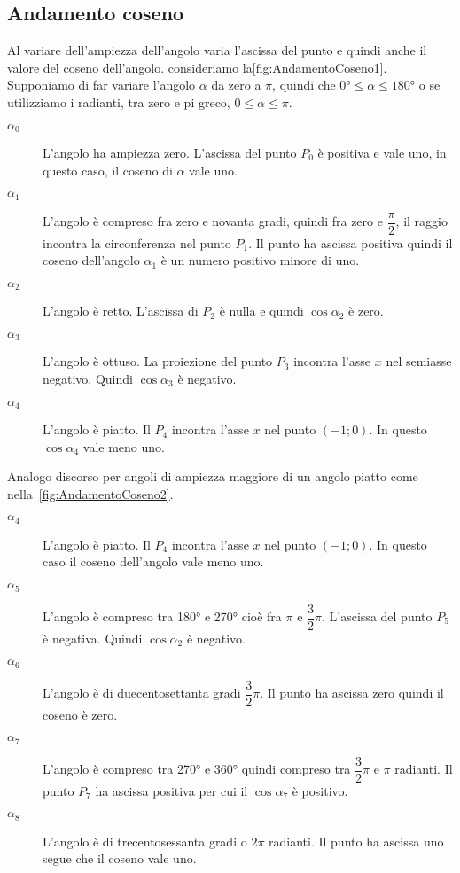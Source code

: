 \subsection{Andamento coseno}
\label{sec:andamentocoseno}
Al variare dell'ampiezza dell'angolo varia l'ascissa del punto e quindi anche il valore del coseno dell'angolo. consideriamo la\nobs\vref{fig:AndamentoCoseno1}. Supponiamo di far variare l'angolo $\alpha$ da zero a $\pi$, quindi che $\ang{0}\leq\alpha\leq\ang{180}$ o se utilizziamo i radianti, tra zero e pi greco, $\num{0}\leq\alpha\leq\pi$. 
\begin{description}
	\item[$\alpha_0$] L'angolo ha ampiezza zero. L'ascissa del punto $P_0$ è positiva e vale uno, in questo caso, il coseno di $\alpha$ vale uno.
	\item [$\alpha_1$] L'angolo è compreso fra zero e novanta gradi, quindi fra zero e $\dfrac{\pi}{2} $, il raggio incontra la circonferenza nel punto $P_1$. Il punto ha ascissa positiva quindi il coseno dell'angolo $\alpha_1$ è un numero positivo minore di uno.
	\item [$\alpha_2$] L'angolo è retto. L'ascissa di $P_{2}$ è nulla e quindi $\cos\alpha_2$ è zero. 
	\item [$\alpha_3$] L'angolo è ottuso. La proiezione del punto $P_3$ incontra l'asse $x$ nel semiasse negativo. Quindi $\cos\alpha_3$ è negativo.
	\item [$\alpha_4$] L'angolo è piatto. Il $P_4$ incontra l'asse $x$ nel punto $(-1;0)$. In questo $\cos\alpha_4$ vale meno uno.
\end{description}
\begin{figure}
	\centering
	
	\label{fig:circonferenzagonimetricagonio}
\end{figure}
Analogo discorso per angoli di ampiezza maggiore di un angolo piatto come nella~\vref{fig:AndamentoCoseno2}.
\begin{description}
	\item [$\alpha_4$] L'angolo è piatto. Il $P_4$ incontra l'asse $x$ nel punto $(-1;0)$. In questo caso il coseno dell'angolo vale meno uno.
	\item [$\alpha_5$] L'angolo è compreso tra \ang{180} e \ang{270} cioè fra $\pi$ e $\dfrac{3}{2}\pi$. L'ascissa del punto $P_5$ è negativa. Quindi $\cos\alpha_2$ è negativo.
	\item [$\alpha_6$] L'angolo è di duecentosettanta gradi $\dfrac{3}{2}\pi$. Il punto ha ascissa zero quindi il coseno è zero.
	\item [$\alpha_7$] L'angolo è compreso tra \ang{270} e \ang{360} quindi compreso tra $\dfrac{3}{2}\pi$ e $\pi$ radianti. Il punto $P_7$ ha ascissa positiva per cui il $\cos\alpha_7$ è positivo.
	\item [$\alpha_8$] L'angolo è di trecentosessanta gradi o $2\pi$ radianti. Il punto ha ascissa uno segue che il coseno vale uno.
\end{description}
